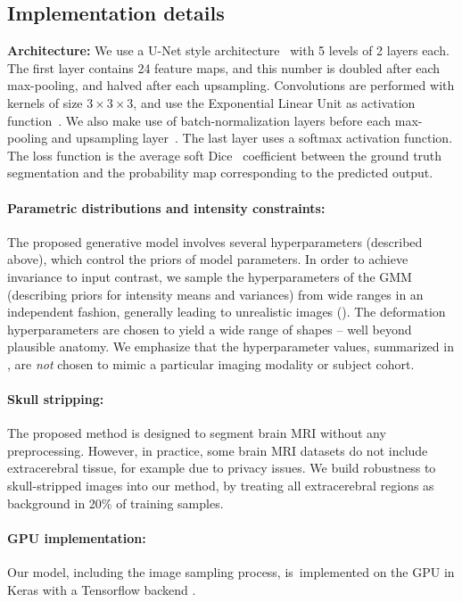 \documentclass{midl}
\begin{document}
\subsection{Implementation details}
\label{implementation details}

\textbf{Architecture:} We use a U-Net style architecture~\cite{ronneberger_u-net_2015,cicek_3d_2016} with 5 levels of 2 layers each. The first layer contains 24 feature maps, and this number is doubled after each max-pooling, and halved after each upsampling. Convolutions are performed with kernels of size $3\times3\times3$, and use the Exponential Linear Unit as activation function~\cite{clevert_fast_2016}. We also make use of batch-normalization layers before each max-pooling and upsampling layer~\cite{ioffe_batch_2015}. The last layer uses a softmax activation function. The loss function is the average soft Dice~\cite{milletari_v-net_2016} coefficient between the ground truth segmentation and the probability map corresponding to the predicted output.

\paragraph{Parametric distributions and intensity constraints:}
The proposed generative model involves several hyperparameters (described above), which control the priors of model parameters. 
In order to achieve invariance to input contrast, we sample the hyperparameters of the GMM (describing priors for intensity means and variances)  from wide ranges in an independent fashion, generally leading to  unrealistic images (). The deformation hyperparameters are chosen to yield a wide range of shapes -- well beyond plausible anatomy. We emphasize that the hyperparameter values, summarized in , are \textit{not} chosen to mimic a particular imaging modality or subject cohort. 

\paragraph{Skull stripping:} 
The proposed method is designed to segment brain MRI without any preprocessing. However, in practice, some brain MRI datasets do not include extracerebral tissue, for example due to privacy issues. We build robustness to skull-stripped images into our method, by treating all extracerebral regions as background in 20\% of training samples. 

\paragraph{GPU implementation:}Our model, including the image sampling process, is~\mbox{implemented} on the GPU in Keras \cite{chollet_keras_2015} with a Tensorflow backend \cite{abadi_tensorflow_2016}.
\end{document}
